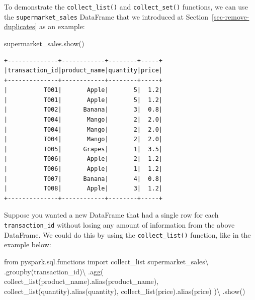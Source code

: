 \documentclass[
  11pt,
  letterpaper,
  DIV=11,
  numbers=noendperiod]{scrreprt}
\newenvironment{Shaded}{\begin{snugshade}}{\end{snugshade}}
\newcommand{\ImportTok}[1]{\textcolor[rgb]{0.00,0.46,0.62}{#1}}
\newcommand{\NormalTok}[1]{\textcolor[rgb]{0.00,0.23,0.31}{#1}}
\newcommand{\OperatorTok}[1]{\textcolor[rgb]{0.37,0.37,0.37}{#1}}
\newcommand{\StringTok}[1]{\textcolor[rgb]{0.13,0.47,0.30}{#1}}
\begin{document}
To demonstrate the \texttt{collect\_list()} and \texttt{collect\_set()}
functions, we can use the \texttt{supermarket\_sales} DataFrame that we
introduced at Section~\ref{sec-remove-duplicates} as an example:

\begin{Shaded}
\begin{Highlighting}[]
\NormalTok{supermarket\_sales.show()}
\end{Highlighting}
\end{Shaded}

\begin{verbatim}
+--------------+------------+--------+-----+
|transaction_id|product_name|quantity|price|
+--------------+------------+--------+-----+
|          T001|       Apple|       5|  1.2|
|          T001|       Apple|       5|  1.2|
|          T002|      Banana|       3|  0.8|
|          T004|       Mango|       2|  2.0|
|          T004|       Mango|       2|  2.0|
|          T004|       Mango|       2|  2.0|
|          T005|      Grapes|       1|  3.5|
|          T006|       Apple|       2|  1.2|
|          T006|       Apple|       1|  1.2|
|          T007|      Banana|       4|  0.8|
|          T008|       Apple|       3|  1.2|
+--------------+------------+--------+-----+
\end{verbatim}

Suppose you wanted a new DataFrame that had a single row for each
\texttt{transaction\_id} without losing any amount of information from
the above DataFrame. We could do this by using the
\texttt{collect\_list()} function, like in the example below:

\begin{Shaded}
\begin{Highlighting}[]
\ImportTok{from}\NormalTok{ pyspark.sql.functions }\ImportTok{import}\NormalTok{ collect\_list}
\NormalTok{supermarket\_sales}\OperatorTok{\textbackslash{}}
\NormalTok{    .groupby(}\StringTok{\textquotesingle{}transaction\_id\textquotesingle{}}\NormalTok{)}\OperatorTok{\textbackslash{}}
\NormalTok{    .agg(}
\NormalTok{        collect\_list(}\StringTok{\textquotesingle{}product\_name\textquotesingle{}}\NormalTok{).alias(}\StringTok{\textquotesingle{}product\_name\textquotesingle{}}\NormalTok{),}
\NormalTok{        collect\_list(}\StringTok{\textquotesingle{}quantity\textquotesingle{}}\NormalTok{).alias(}\StringTok{\textquotesingle{}quantity\textquotesingle{}}\NormalTok{),}
\NormalTok{        collect\_list(}\StringTok{\textquotesingle{}price\textquotesingle{}}\NormalTok{).alias(}\StringTok{\textquotesingle{}price\textquotesingle{}}\NormalTok{)}
\NormalTok{    )}\OperatorTok{\textbackslash{}}
\NormalTok{    .show()}
\end{Highlighting}
\end{Shaded}
\end{document}
